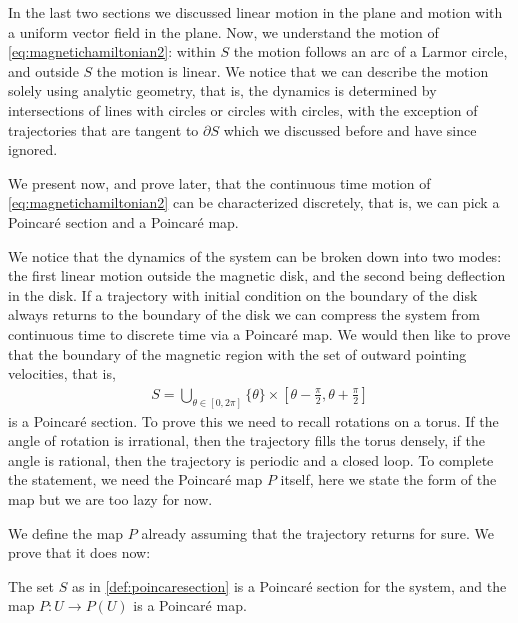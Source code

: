 \color{red}
In the last two sections we discussed linear motion in the plane and motion with a uniform vector field in the plane. Now, we understand the motion of \eqref{eq:magnetichamiltonian2}: within $S$ the motion follows an arc of a Larmor circle, and outside $S$ the motion is linear. We notice that we can describe the motion solely using analytic geometry, that is, the dynamics is determined by intersections of lines with circles or circles with circles, with the exception of trajectories that are tangent to $\partial S$ which we discussed before and have since ignored.

We present now, and prove later, that the continuous time motion of \eqref{eq:magnetichamiltonian2} can be characterized discretely, that is, we can pick a Poincar\'e section and a Poincar\'e map.
\color{black}

We notice that the dynamics of the system can be broken down into two modes: the first linear motion outside the magnetic disk, and the second being deflection in the disk. If a trajectory with initial condition on the boundary of the disk always returns to the boundary of the disk we can compress the system from continuous time to discrete time via a Poincar\'e map. We would then like to prove that the boundary of the magnetic region with the set of outward pointing velocities, that is,
\begin{align}\label{def:poincaresection}
S = \bigcup_{\theta\in[0,2\pi]}\{\theta\}\times\left[\theta-\frac{\pi}{2},\theta+\frac{\pi}{2} \right]
\end{align}
is a Poincar\'e section. To prove this we need to recall rotations on a torus. If the angle of rotation is irrational, then the trajectory fills the torus densely, if the angle is rational, then the trajectory is periodic and a closed loop. To complete the statement, we need the Poincar\'e map $P$ itself, \color{red}here we state the form of the map but we are too lazy for now.\color{black}

We define the map $P$ already assuming that the trajectory returns for sure. We prove that it does now:

\begin{proposition}
The set $S$ as in \eqref{def:poincaresection} is a Poincar\'e section for the system, and the map $P:U\to P(U)$ is a Poincar\'e map.
\end{proposition}


